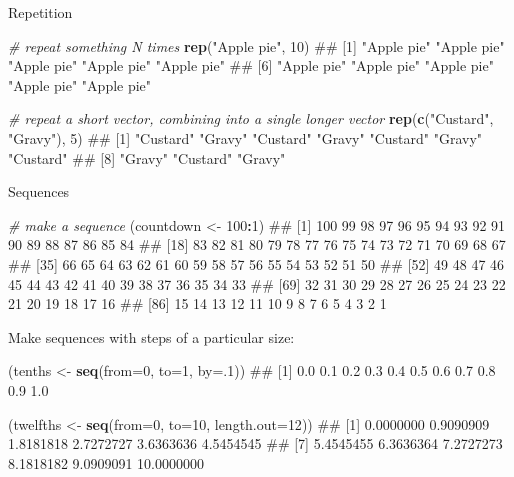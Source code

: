 \documentclass[]{article}
\newenvironment{Shaded}{\begin{snugshade}}{\end{snugshade}}
\newcommand{\KeywordTok}[1]{\textcolor[rgb]{0.13,0.29,0.53}{\textbf{#1}}}
\newcommand{\DataTypeTok}[1]{\textcolor[rgb]{0.13,0.29,0.53}{#1}}
\newcommand{\DecValTok}[1]{\textcolor[rgb]{0.00,0.00,0.81}{#1}}
\newcommand{\StringTok}[1]{\textcolor[rgb]{0.31,0.60,0.02}{#1}}
\newcommand{\CommentTok}[1]{\textcolor[rgb]{0.56,0.35,0.01}{\textit{#1}}}
\newcommand{\OperatorTok}[1]{\textcolor[rgb]{0.81,0.36,0.00}{\textbf{#1}}}
\newcommand{\NormalTok}[1]{#1}
\theoremstyle{definition}
\theoremstyle{definition}
\theoremstyle{definition}
\theoremstyle{remark}
\begin{document}
Repetition

\begin{Shaded}
\begin{Highlighting}[]
\CommentTok{# repeat something N times}
\KeywordTok{rep}\NormalTok{(}\StringTok{"Apple pie"}\NormalTok{, }\DecValTok{10}\NormalTok{)}
\NormalTok{##  [1] "Apple pie" "Apple pie" "Apple pie" "Apple pie" "Apple pie"}
\NormalTok{##  [6] "Apple pie" "Apple pie" "Apple pie" "Apple pie" "Apple pie"}
\end{Highlighting}
\end{Shaded}

\begin{Shaded}
\begin{Highlighting}[]
\CommentTok{# repeat a short vector, combining into a single longer vector}
\KeywordTok{rep}\NormalTok{(}\KeywordTok{c}\NormalTok{(}\StringTok{"Custard"}\NormalTok{, }\StringTok{"Gravy"}\NormalTok{), }\DecValTok{5}\NormalTok{)}
\NormalTok{##  [1] "Custard" "Gravy"   "Custard" "Gravy"   "Custard" "Gravy"   "Custard"}
\NormalTok{##  [8] "Gravy"   "Custard" "Gravy"}
\end{Highlighting}
\end{Shaded}

Sequences

\begin{Shaded}
\begin{Highlighting}[]
\CommentTok{# make a sequence }
\NormalTok{(countdown <-}\StringTok{ }\DecValTok{100}\OperatorTok{:}\DecValTok{1}\NormalTok{)}
\NormalTok{##   [1] 100  99  98  97  96  95  94  93  92  91  90  89  88  87  86  85  84}
\NormalTok{##  [18]  83  82  81  80  79  78  77  76  75  74  73  72  71  70  69  68  67}
\NormalTok{##  [35]  66  65  64  63  62  61  60  59  58  57  56  55  54  53  52  51  50}
\NormalTok{##  [52]  49  48  47  46  45  44  43  42  41  40  39  38  37  36  35  34  33}
\NormalTok{##  [69]  32  31  30  29  28  27  26  25  24  23  22  21  20  19  18  17  16}
\NormalTok{##  [86]  15  14  13  12  11  10   9   8   7   6   5   4   3   2   1}
\end{Highlighting}
\end{Shaded}

Make sequences with steps of a particular size:

\begin{Shaded}
\begin{Highlighting}[]
\NormalTok{(tenths  <-}\StringTok{ }\KeywordTok{seq}\NormalTok{(}\DataTypeTok{from=}\DecValTok{0}\NormalTok{, }\DataTypeTok{to=}\DecValTok{1}\NormalTok{, }\DataTypeTok{by=}\NormalTok{.}\DecValTok{1}\NormalTok{))}
\NormalTok{##  [1] 0.0 0.1 0.2 0.3 0.4 0.5 0.6 0.7 0.8 0.9 1.0}

\NormalTok{(twelfths <-}\StringTok{ }\KeywordTok{seq}\NormalTok{(}\DataTypeTok{from=}\DecValTok{0}\NormalTok{, }\DataTypeTok{to=}\DecValTok{10}\NormalTok{, }\DataTypeTok{length.out=}\DecValTok{12}\NormalTok{))}
\NormalTok{##  [1]  0.0000000  0.9090909  1.8181818  2.7272727  3.6363636  4.5454545}
\NormalTok{##  [7]  5.4545455  6.3636364  7.2727273  8.1818182  9.0909091 10.0000000}
\end{Highlighting}
\end{Shaded}
\end{document}
